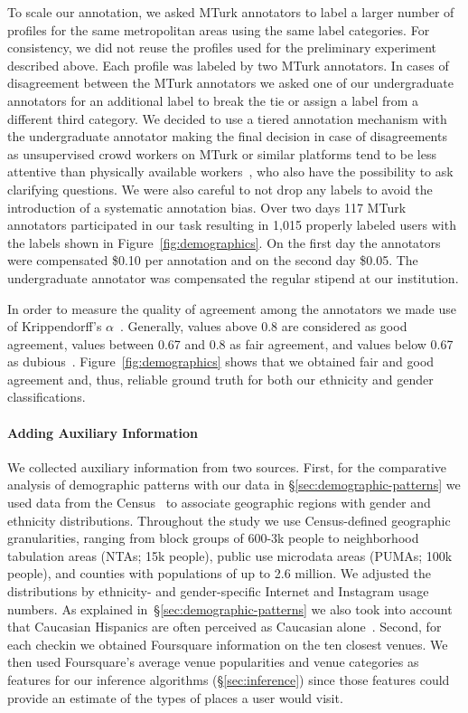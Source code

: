 To scale our annotation, we asked MTurk annotators to label a larger number of profiles for the same metropolitan areas using the same label categories. For consistency, we did not reuse the profiles used for the preliminary experiment described above. Each profile was labeled by two MTurk annotators. In cases of disagreement between the MTurk annotators we asked one of our undergraduate annotators for an additional label to break the tie or assign a label from a different third category. We decided to use a tiered annotation mechanism with the undergraduate annotator making the final decision in case of disagreements as unsupervised crowd workers on MTurk or similar platforms tend to be less attentive than physically available workers~\cite{Paolacci10runningexperiments}, who also have the possibility to ask clarifying questions. We were also careful to not drop any labels to avoid the introduction of a systematic annotation bias. Over two days 117 MTurk annotators participated in our task resulting in 1,015 properly labeled users with the labels shown in Figure~\ref{fig:demographics}. On the first day the annotators were compensated \$0.10 per annotation and on the second day \$0.05. The undergraduate annotator was compensated the regular stipend at our institution.

In order to measure the quality of agreement among the annotators we made use of Krippendorff's $\alpha$~\cite{Krippendorff}. Generally, values above 0.8 are considered as good agreement, values between 0.67 and 0.8 as fair agreement, and values below 0.67 as dubious~\cite{Manning:2008:IIR:1394399}. Figure~\ref{fig:demographics} shows that we obtained fair and good agreement and, thus, reliable ground truth for both our ethnicity and gender classifications. 

\paragraph{Adding Auxiliary Information}
We collected auxiliary information from two sources. First, for the comparative analysis of demographic patterns with our data in \S\ref{sec:demographic-patterns} we used data from the Census~\cite{census:2010} to associate geographic regions with gender and ethnicity distributions. 
Throughout the study we use Census-defined geographic granularities, ranging from block groups of 600-3k people to neighborhood tabulation areas (NTAs; 15k people), public use microdata areas (PUMAs; 100k people), and counties with populations of up to 2.6 million.
We adjusted the distributions by ethnicity- and gender-specific Internet \cite{file:2013,PewSocialMedia2012} and Instagram \cite{Pew2012} usage numbers. As explained in~\S\ref{sec:demographic-patterns} we also took into account that Caucasian Hispanics are often perceived as Caucasian alone~\cite{MelaninMillennium}. Second, for each checkin we obtained Foursquare information on the ten closest venues. We then used Foursquare's average venue popularities and venue categories as features for our inference algorithms (\S\ref{sec:inference}) since those features could provide an estimate of the types of places a user would visit.
